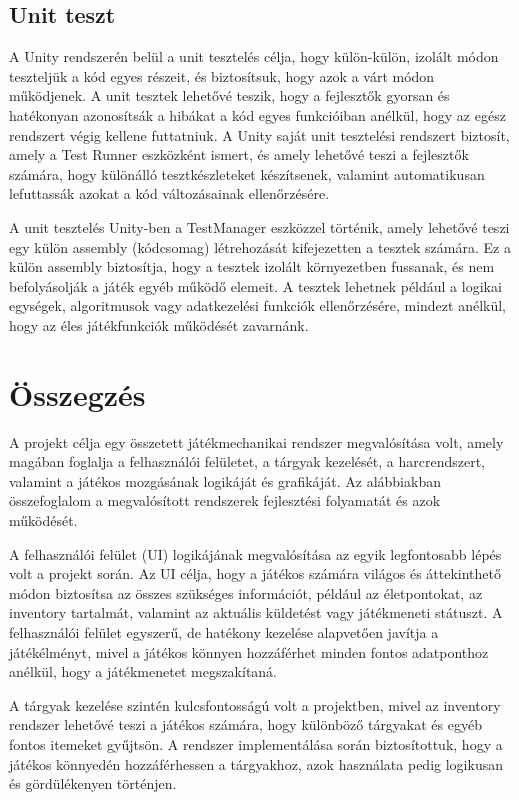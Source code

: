 \documentclass[
]{thesis-ekf}
\theoremstyle{definition}
\theoremstyle{remark}
\begin{document}
\section{Unit teszt}
A Unity rendszerén belül a unit tesztelés célja, hogy külön-külön, izolált módon teszteljük a kód egyes részeit, és biztosítsuk, hogy azok a várt módon működjenek. A unit tesztek lehetővé teszik, hogy a fejlesztők gyorsan és hatékonyan azonosítsák a hibákat a kód egyes funkcióiban anélkül, hogy az egész rendszert végig kellene futtatniuk. A Unity saját unit tesztelési rendszert biztosít, amely a Test Runner eszközként ismert, és amely lehetővé teszi a fejlesztők számára, hogy különálló tesztkészleteket készítsenek, valamint automatikusan lefuttassák azokat a kód változásainak ellenőrzésére.

A unit tesztelés Unity-ben a TestManager eszközzel történik, amely lehetővé teszi egy külön assembly (kódcsomag) létrehozását kifejezetten a tesztek számára. Ez a külön assembly biztosítja, hogy a tesztek izolált környezetben fussanak, és nem befolyásolják a játék egyéb működő elemeit. A tesztek lehetnek például a logikai egységek, algoritmusok vagy adatkezelési funkciók ellenőrzésére, mindezt anélkül, hogy az éles játékfunkciók működését zavarnánk.\cite{UnityTestRunner}
\chapter*{Összegzés}
A projekt célja egy összetett játékmechanikai rendszer megvalósítása volt, amely magában foglalja a felhasználói felületet, a tárgyak kezelését, a harcrendszert, valamint a játékos mozgásának logikáját és grafikáját. Az alábbiakban összefoglalom a megvalósított rendszerek fejlesztési folyamatát és azok működését.

A felhasználói felület (UI) logikájának megvalósítása az egyik legfontosabb lépés volt a projekt során. Az UI célja, hogy a játékos számára világos és áttekinthető módon biztosítsa az összes szükséges információt, például az életpontokat, az inventory tartalmát, valamint az aktuális küldetést vagy játékmeneti státuszt. A felhasználói felület egyszerű, de hatékony kezelése alapvetően javítja a játékélményt, mivel a játékos könnyen hozzáférhet minden fontos adatponthoz anélkül, hogy a játékmenetet megszakítaná.

A tárgyak kezelése szintén kulcsfontosságú volt a projektben, mivel az inventory rendszer lehetővé teszi a játékos számára, hogy különböző tárgyakat és egyéb fontos itemeket gyűjtsön. A rendszer implementálása során biztosítottuk, hogy a játékos könnyedén hozzáférhessen a tárgyakhoz, azok használata pedig logikusan és gördülékenyen történjen.
\end{document}
